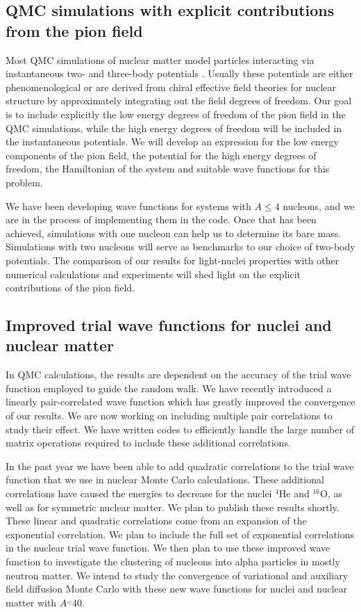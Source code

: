 \documentclass[12pt,letterpaper]{article}
\begin{document}
\subsection{QMC simulations with explicit contributions from the pion field}
\label{sec:pions}

Most QMC simulations of nuclear matter model particles interacting via
instantaneous two- and three-body
potentials \cite{car15}. Usually these potentials are either
phenomenological or are derived from chiral 
effective field theories for nuclear structure by approximately integrating 
out the field
degrees of freedom. Our goal is to include explicitly the low energy degrees 
of freedom of the pion field in the QMC
simulations, while the high energy degrees of freedom will be included in 
the instantaneous potentials. We will develop an expression for the low 
energy components of the pion field, the potential for the high energy 
degrees of freedom, the Hamiltonian of the system and suitable wave functions 
for this problem.

We have been developing wave functions for systems with $A\leqslant 4$ 
nucleons, and we are in the process of implementing them in the code. Once that 
has been achieved, simulations with one nucleon can help us to determine its 
bare mass. Simulations with two nucleons will serve as benchmarks to our choice 
of two-body potentials. The comparison of our results for light-nuclei 
properties with other numerical calculations and experiments will shed light on 
the explicit contributions of the pion field.  

\subsection{Improved trial wave functions for nuclei and nuclear matter}
\label{sec:improved}

In QMC calculations, the results are dependent on the accuracy of the trial 
wave
function employed to guide the random walk. We have recently introduced
a linearly pair-correlated wave function which has greatly improved the
convergence of our results\cite{gan14}. We are now working on
including multiple pair correlations to study their effect. 
We have written codes to efficiently handle the large number of
matrix operations required to include these additional correlations.

In the past year we have been able to add quadratic correlations to the trial 
wave function that we use in nuclear Monte Carlo calculations. These additional 
correlations have caused the energies to decrease for the nuclei $^4$He and 
$^{16}$O, as well as for symmetric nuclear matter. We plan to publish these 
results shortly.
These linear and quadratic correlations come from an expansion of the 
exponential correlation. We plan to include the full set of exponential 
correlations in the nuclear trial wave function. We then plan to use these 
improved wave function to investigate the clustering of nucleons into alpha 
particles in mostly neutron matter.
We intend to study the convergence of variational and auxiliary field
diffusion Monte Carlo with these new wave functions for nuclei and
nuclear matter with $A \stackrel{<}{~} 40$.
\end{document}
